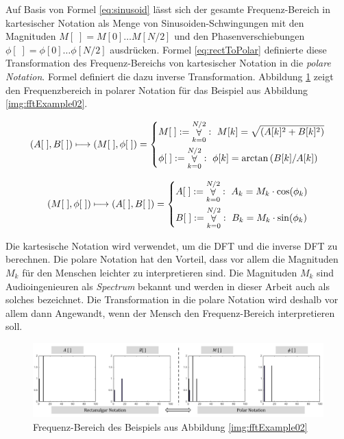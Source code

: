 Auf Basis von Formel \ref{eq:sinusoid} lässt sich der gesamte Frequenz-Bereich in kartesischer Notation als Menge von Sinusoiden-Schwingungen mit den Magnituden $M[\;] = M[0] \ldots M[N/2]$ und den Phasenverschiebungen $\phi[\;] = \phi[0] \ldots \phi[N/2]$ ausdrücken. Formel \ref{eq:rectToPolar} definierte diese Transformation des Frequenz-Bereichs von kartesischer Notation in die \emph{polare Notation}. Formel \label{eq:polarToRect} definiert die dazu inverse Transformation. \cite[S. 162]{dspGuide} Abbildung \ref{img:polarToRect02} zeigt den Frequenzbereich in polarer Notation für das Beispiel aus  Abbildung \ref{img:fftExample02}.

\begin{equation}
(A[\;], B[\;]) \longmapsto (M[\;], \phi[\;])  = 
\begin{dcases}
M[\;] := \mathop{\forall}_{k = 0}^{N/2} :\ M[k] = \sqrt{(A[k]^2 + B[k]^2 ) }   \\
 \phi[\;]  := \mathop{\forall}_{k = 0}^{N/2} :\ \phi[k]= \arctan{(B[k] / A[k]) }
\end{dcases}
\label{eq:rectToPolar}
\end{equation}

\begin{equation}
(M[\;], \phi[\;]) \longmapsto (A[\;], B[\;])  =
\begin{dcases}
A[\;]  := \mathop{\forall}_{k = 0}^{N/2} :\ A_k= M_k \cdot \cos(\phi_k) \\
B[\;]  := \mathop{\forall}_{k = 0}^{N/2} :\ B_k = M_k \cdot \sin(\phi_k)
\end{dcases}
\label{eq:polarToRect}
\end{equation}

Die kartesische Notation wird verwendet, um die DFT und die inverse DFT zu berechnen. Die polare Notation hat den Vorteil, dass vor allem die Magnituden $M_k$ für den Menschen leichter zu interpretieren sind. Die Magnituden $M_k$ sind Audioingenieuren als \emph{Spectrum} bekannt und werden in dieser Arbeit auch als solches bezeichnet. Die Transformation in die polare Notation wird deshalb vor allem dann Angewandt, wenn der Mensch den Frequenz-Bereich interpretieren soll. \cite[S. 164]{dspGuide}

\begin{figure}[h]
	\centering
	\includegraphics[width=1\textwidth]{bilder/rectToPolar03.png}
	\caption{Frequenz-Bereich des Beispiels aus Abbildung \ref{img:fftExample02}}
	\label{img:polarToRect02}
\end{figure}


